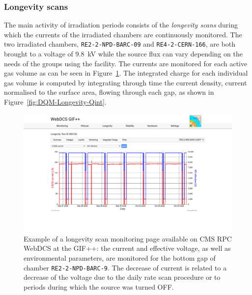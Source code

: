 		\subsubsection{Longevity scans}
		\label{chapt5:sssec:longscan}
	
	The main activity of irradiation periods consists of the \textit{longevity scans} during which the currents of the irradiated chambers are continuously monitored. The two irradiated chambers, \texttt{RE2-2-NPD-BARC-09} and \texttt{RE4-2-CERN-166}, are both brought to a voltage of \SI{9.8}{kV} while the source flux can vary depending on the needs of the groups using the facility. The currents are monitored for each active gas volume as can be seen in Figure~\ref{fig:DQM-Longevity-Monitoring}. The integrated charge for each individual gas volume is computed by integrating through time the current density, current normalised to the surface area, flowing through each gap, as shown in Figure~\ref{fig:DQM-Longevity-Qint}.
	
\newpage
	
	\begin{figure}[H]
        \centering
		\includegraphics[width = \linewidth]{fig/chapt5/Longevity-scan-I-HVeff-vs-Time.png}
		\caption{\label{fig:DQM-Longevity-Monitoring} Example of a longevity scan monitoring page available on CMS RPC WebDCS at the GIF++: the current and effective voltage, as well as environmental parameters, are monitored for the bottom gap of chamber \texttt{RE2-2-NPD-BARC-9}. The decrease of current is related to a decrease of the voltage due to the daily rate scan procedure or to periods during which the source was turned OFF.}
	\end{figure}
	
